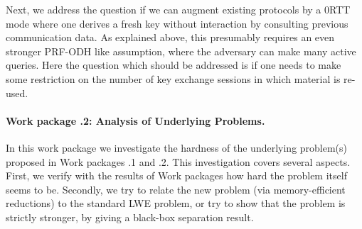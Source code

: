 Next, we address the question if we can augment existing protocols by a 0RTT mode where one derives a fresh key without interaction by consulting previous communication data. As explained above, this presumably requires an even stronger PRF-ODH like assumption, where the adversary can make many active queries. Here the question which should be addressed is if one needs to make some restriction on the number of key exchange sessions in which material is re-used.



\paragraph{Work package .2: Analysis of Underlying Problems.}

In this work package we investigate the hardness of the underlying problem(s) proposed in Work packages .1 and .2. This investigation covers several aspects. First, we verify with the results of Work packages  how hard the problem itself seems to be. Secondly, we try to relate the new problem (via memory-efficient reductions) to the standard LWE problem, or try to show that the problem is strictly stronger, by giving a black-box separation result.



